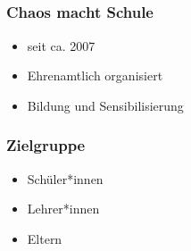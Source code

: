 \documentclass[12pt]{beamer}
\begin{document}
\subsection{}
  
\begin{frame}
	\frametitle{Chaos macht Schule}
	\begin{itemize}
		\item<1-> seit ca. 2007
		\item<2-> Ehrenamtlich organisiert
		\item<3-> Bildung und Sensibilisierung
	\end{itemize}
\end{frame}
  
\begin{frame}
	\frametitle{Zielgruppe}
	\begin{itemize}
		\item<1-> Schüler*innen
		\item<2-> Lehrer*innen
		\item<3-> Eltern 
	\end{itemize}
\end{frame}
  
\end{document}
